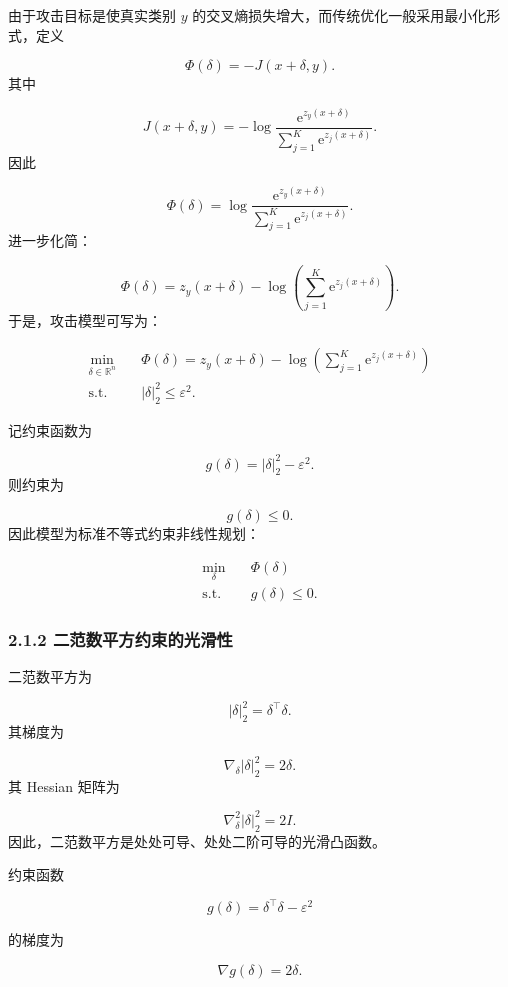 ﻿\documentclass[UTF8,zihao=-4,fontset=none]{ctexart}
\begin{document}
由于攻击目标是使真实类别 \(y\) 的交叉熵损失增大，而传统优化一般采用最小化形式，定义

\[
\Phi(\delta)
=
-J(x+\delta,y).
\]
\noindent 其中

\[
J(x+\delta,y)
=
-\log
\frac{\mathrm{e}^{z_y(x+\delta)}}{\sum_{j=1}^{K}\mathrm{e}^{z_j(x+\delta)}}.
\]
\noindent 因此

\[
\Phi(\delta)
=
\log
\frac{\mathrm{e}^{z_y(x+\delta)}}{\sum_{j=1}^{K}\mathrm{e}^{z_j(x+\delta)}}.
\]
\noindent 进一步化简：

\[
\Phi(\delta)
=
z_y(x+\delta)
-
\log
\left(
\sum_{j=1}^{K}\mathrm{e}^{z_j(x+\delta)}
\right).
\]
\noindent 于是，攻击模型可写为：

\[
\begin{aligned}
\min_{\delta\in\mathbb{R}^n}
\quad
&
\Phi(\delta)
=
z_y(x+\delta)
-
\log
\left(
\sum_{j=1}^{K}\mathrm{e}^{z_j(x+\delta)}
\right)\\
\mathrm{s.t.}
\quad
&
|\delta|_2^2\le \varepsilon^2.
\end{aligned}
\]

记约束函数为

\[
g(\delta)=|\delta|_2^2-\varepsilon^2.
\]
\noindent 则约束为

\[
g(\delta)\le 0.
\]
\noindent 因此模型为标准不等式约束非线性规划：

\[
\begin{aligned}
\min_{\delta}
\quad & \Phi(\delta)\\
\mathrm{s.t.}
\quad & g(\delta)\le 0.
\end{aligned}
\]

\subsubsection*{2.1.2 二范数平方约束的光滑性}
{}

二范数平方为

\[
|\delta|_2^2
=
\delta^\top\delta.
\]
\noindent 其梯度为

\[
\nabla_\delta |\delta|_2^2
=
2\delta.
\]
\noindent 其 Hessian 矩阵为

\[
\nabla_\delta^2 |\delta|_2^2
=
2I.
\]
\noindent 因此，二范数平方是处处可导、处处二阶可导的光滑凸函数。

约束函数

\[
g(\delta)=\delta^\top\delta-\varepsilon^2
\]

的梯度为

\[
\nabla g(\delta)=2\delta.
\]
\end{document}
